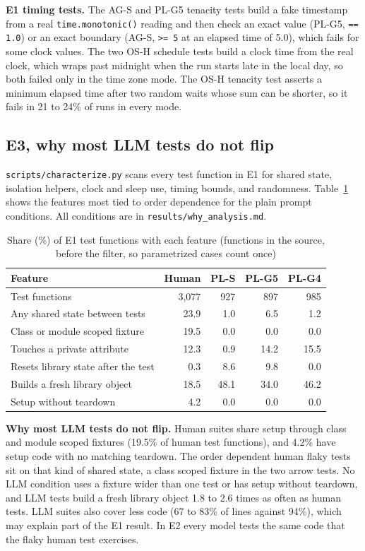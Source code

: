 \documentclass[sigconf,nonacm]{acmart}
\begin{document}
\textbf{E1 timing tests.} The AG-S and PL-G5 tenacity tests build a fake timestamp from a real \texttt{time.monotonic()} reading and then check an exact value (PL-G5, \texttt{== 1.0}) or an exact boundary (AG-S, \texttt{>= 5} at an elapsed time of 5.0), which fails for some clock values. The two OS-H schedule tests build a clock time from the real clock, which wraps past midnight when the run starts late in the local day, so both failed only in the time zone mode. The OS-H tenacity test asserts a minimum elapsed time after two random waits whose sum can be shorter, so it fails in 21 to 24\% of runs in every mode.

\subsection{E3, why most LLM tests do not flip}
\label{sec:why}
\texttt{scripts/characterize.py} scans every test function in E1 for shared state, isolation helpers, clock and sleep use, timing bounds, and randomness. Table~\ref{tab:why} shows the features most tied to order dependence for the plain prompt conditions. All conditions are in \texttt{results/why\_analysis.md}.

\begin{table}[h]
\caption{Share (\%) of E1 test functions with each feature (functions in the source, before the filter, so parametrized cases count once)}
\label{tab:why}
\small
\begin{tabular}{lrrrr}
\toprule
Feature & Human & PL-S & PL-G5 & PL-G4 \\
\midrule
Test functions & 3,077 & 927 & 897 & 985 \\
Any shared state between tests & 23.9 & 1.0 & 6.5 & 1.2 \\
Class or module scoped fixture & 19.5 & 0.0 & 0.0 & 0.0 \\
Touches a private attribute & 12.3 & 0.9 & 14.2 & 15.5 \\
Resets library state after the test & 0.3 & 8.6 & 9.8 & 0.0 \\
Builds a fresh library object & 18.5 & 48.1 & 34.0 & 46.2 \\
Setup without teardown & 4.2 & 0.0 & 0.0 & 0.0 \\
\bottomrule
\end{tabular}
\end{table}

\textbf{Why most LLM tests do not flip.} Human suites share setup through class and module scoped fixtures (19.5\% of human test functions), and 4.2\% have setup code with no matching teardown. The order dependent human flaky tests sit on that kind of shared state, a class scoped fixture in the two arrow tests. No LLM condition uses a fixture wider than one test or has setup without teardown, and LLM tests build a fresh library object 1.8 to 2.6 times as often as human tests. LLM suites also cover less code (67 to 83\% of lines against 94\%), which may explain part of the E1 result. In E2 every model tests the same code that the flaky human test exercises.
\end{document}
